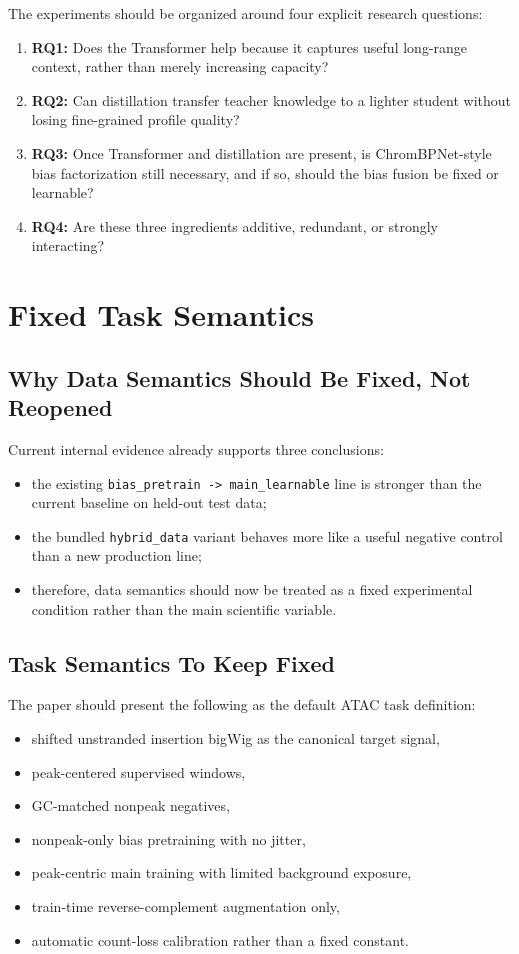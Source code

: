 \documentclass[11pt]{article}
\begin{document}
The experiments should be organized around four explicit research questions:
\begin{enumerate}[leftmargin=2em]
  \item \textbf{RQ1:} Does the Transformer help because it captures useful
  long-range context, rather than merely increasing capacity?
  \item \textbf{RQ2:} Can distillation transfer teacher knowledge to a lighter
  student without losing fine-grained profile quality?
  \item \textbf{RQ3:} Once Transformer and distillation are present, is
  ChromBPNet-style bias factorization still necessary, and if so, should the
  bias fusion be fixed or learnable?
  \item \textbf{RQ4:} Are these three ingredients additive, redundant, or
  strongly interacting?
\end{enumerate}

\section{Fixed Task Semantics}

\subsection{Why Data Semantics Should Be Fixed, Not Reopened}
Current internal evidence already supports three conclusions:
\begin{itemize}[leftmargin=2em]
  \item the existing \texttt{bias\_pretrain -> main\_learnable} line is stronger
  than the current baseline on held-out test data;
  \item the bundled \texttt{hybrid\_data} variant behaves more like a useful
  negative control than a new production line;
  \item therefore, data semantics should now be treated as a fixed experimental
  condition rather than the main scientific variable.
\end{itemize}

\subsection{Task Semantics To Keep Fixed}
The paper should present the following as the default ATAC task definition:
\begin{itemize}[leftmargin=2em]
  \item shifted unstranded insertion bigWig as the canonical target signal,
  \item peak-centered supervised windows,
  \item GC-matched nonpeak negatives,
  \item nonpeak-only bias pretraining with no jitter,
  \item peak-centric main training with limited background exposure,
  \item train-time reverse-complement augmentation only,
  \item automatic count-loss calibration rather than a fixed constant.
\end{itemize}
\end{document}
